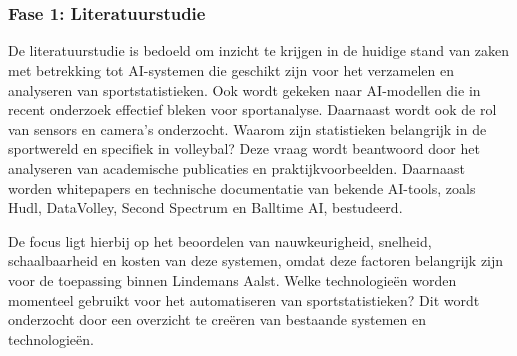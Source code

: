 
\chapter{}%
\label{ch:methodologie}



\subsection{Fase 1: Literatuurstudie}
De literatuurstudie is bedoeld om inzicht te krijgen in de huidige stand van zaken met betrekking tot AI-systemen die geschikt zijn voor het verzamelen en analyseren van sportstatistieken. Ook wordt gekeken naar AI-modellen die in recent onderzoek effectief bleken voor sportanalyse. Daarnaast wordt ook de rol van sensors en camera's onderzocht. Waarom zijn statistieken belangrijk in de sportwereld en specifiek in volleybal? Deze vraag wordt beantwoord door het analyseren van academische publicaties en praktijkvoorbeelden. Daarnaast worden whitepapers en technische documentatie van bekende AI-tools, zoals Hudl, DataVolley, Second Spectrum en Balltime AI, bestudeerd.

De focus ligt hierbij op het beoordelen van nauwkeurigheid, snelheid, schaalbaarheid en kosten van deze systemen, omdat deze factoren belangrijk zijn voor de toepassing binnen Lindemans Aalst. Welke technologieën worden momenteel gebruikt voor het automatiseren van sportstatistieken? Dit wordt onderzocht door een overzicht te creëren van bestaande systemen en technologieën.

